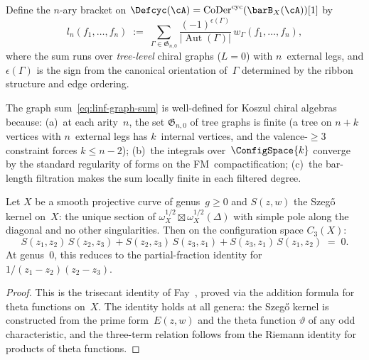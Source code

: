 \begin{construction}\label{constr:linf-from-graphs}
Define the $n$-ary bracket on
$\Defcyc(\cA) = \operatorname{CoDer}^{\mathrm{cyc}}(\barB_X(\cA))[1]$
by
\begin{equation}\label{eq:linf-graph-sum}
l_n(f_1, \ldots, f_n)
\;:=\;
\sum_{\Gamma \in \mathfrak{G}_{n,0}}
\frac{(-1)^{\epsilon(\Gamma)}}
{\lvert\operatorname{Aut}(\Gamma)\rvert}
\, w_\Gamma(f_1, \ldots, f_n),
\end{equation}
where the sum runs over \emph{tree-level} chiral graphs ($L = 0$) with
$n$~external legs, and $\epsilon(\Gamma)$ is the sign from the
canonical orientation of~$\Gamma$ determined by the ribbon structure
and edge ordering.
\end{construction}

The graph sum~\eqref{eq:linf-graph-sum} is well-defined for Koszul
chiral algebras because:
(a)~at each arity~$n$, the set $\mathfrak{G}_{n,0}$ of tree graphs
is finite (a tree on $n + k$ vertices with $n$~external legs has
$k$~internal vertices, and the valence-$\geq 3$ constraint forces
$k \leq n - 2$);
(b)~the integrals over~$\ConfigSpace{k}$ converge by the
standard regularity of forms on the FM~compactification;
(c)~the bar-length filtration makes the sum locally finite in each
filtered degree.

\begin{proposition}\label{prop:fay-trisecant}
Let $X$ be a smooth projective curve of genus~$g \geq 0$ and
$S(z,w)$ the Szeg\H{o} kernel on~$X$: the unique section of
$\omega_X^{1/2} \boxtimes \omega_X^{1/2}(\Delta)$ with simple pole
along the diagonal and no other singularities.  Then on the
configuration space $C_3(X)$:
\begin{equation}\label{eq:algebraic-fay}
S(z_1, z_2)\,S(z_2, z_3) + S(z_2, z_3)\,S(z_3, z_1) +
S(z_3, z_1)\,S(z_1, z_2) \;=\; 0.
\end{equation}
At genus~$0$, this reduces to the partial-fraction identity for
$1/(z_1-z_2)(z_2-z_3)$.
\end{proposition}

\begin{proof}
This is the trisecant identity of Fay~\cite[Corollary~2.5]{Fay73},
proved via the addition formula for theta functions on~$X$.
The identity holds at all genera: the Szeg\H{o} kernel is
constructed from the prime form~$E(z,w)$ and the theta function
$\vartheta$ of any odd characteristic, and the three-term relation
follows from the Riemann identity for products of theta functions.
\end{proof}

